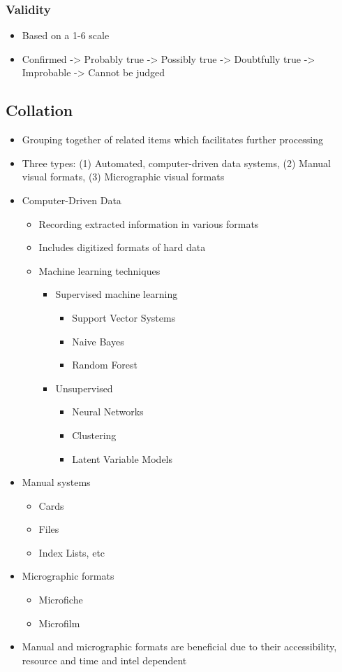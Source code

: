 \documentclass[11pt]{article}
\begin{document}
\subsubsection{Validity}
\label{sec:org98a8a0f}
\begin{itemize}
\item Based on a 1-6 scale
\item Confirmed -> Probably true -> Possibly true -> Doubtfully true -> Improbable -> Cannot be judged
\end{itemize}
\subsection{Collation}
\label{sec:org7ac6b92}
\begin{itemize}
\item Grouping together of related items which facilitates further processing
\item Three types: (1) Automated, computer-driven data systems, (2) Manual visual formats, (3) Micrographic visual formats
\item Computer-Driven Data
\begin{itemize}
\item Recording extracted information in various formats
\item Includes digitized formats of hard data
\item Machine learning techniques
\begin{itemize}
\item Supervised machine learning
\begin{itemize}
\item Support Vector Systems
\item Naive Bayes
\item Random Forest
\end{itemize}
\item Unsupervised
\begin{itemize}
\item Neural Networks
\item Clustering
\item Latent Variable Models
\end{itemize}
\end{itemize}
\end{itemize}
\item Manual systems
\begin{itemize}
\item Cards
\item Files
\item Index Lists, etc
\end{itemize}
\item Micrographic formats
\begin{itemize}
\item Microfiche
\item Microfilm
\end{itemize}
\item Manual and micrographic formats are beneficial due to their accessibility, resource and time and intel dependent
\end{itemize}
\end{document}
